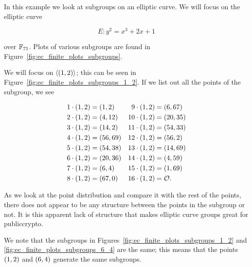 \begin{example}

In this example we look at \glspl{subgroup} on an \gls{elliptic curve}.
We will focus on the \gls{elliptic curve}

\begin{equation}
    E: y^{2} = x^{3} + 2x + 1
\end{equation}

\noindent
over $\mathbb{F}_{71}$.
Plots of various \glspl{subgroup} are found in
Figure~\ref{fig:ec_finite_plots_subgroups}.

We will focus on $\left\langle \left( 1,2 \right) \right\rangle$;
this can be seen in
Figure~\ref{fig:ec_finite_plots_subgroups_1_2}.
If we list out all the points of the \gls{subgroup}, we see

\begin{align}
    1\cdot \left( 1,2 \right)  &= \left( 1,2 \right)
        &
    9\cdot \left( 1,2 \right)  &= \left( 6,67 \right) \nonumber\\
    2\cdot \left( 1,2 \right)  &= \left( 4,12 \right)
        &
    10\cdot \left( 1,2 \right) &= \left( 20,35 \right) \nonumber\\
    3\cdot \left( 1,2 \right)  &= \left( 14,2 \right)
        &
    11\cdot \left( 1,2 \right) &= \left( 54,33 \right) \nonumber\\
    4\cdot \left( 1,2 \right)  &= \left( 56,69 \right)
        &
    12\cdot \left( 1,2 \right) &= \left( 56,2 \right) \nonumber\\
    5\cdot \left( 1,2 \right)  &= \left( 54,38 \right)
        &
    13\cdot \left( 1,2 \right) &= \left( 14,69 \right) \nonumber\\
    6\cdot \left( 1,2 \right)  &= \left( 20,36 \right)
        &
    14\cdot \left( 1,2 \right) &= \left( 4,59 \right) \nonumber\\
    7\cdot \left( 1,2 \right)  &= \left( 6,4 \right)
        &
    15\cdot \left( 1,2 \right) &= \left( 1,69 \right) \nonumber\\
    8\cdot \left( 1,2 \right)  &= \left( 67,0 \right)
        &
    16\cdot \left( 1,2 \right) &= \mathcal{O}.
    \label{eq:elliptic_ecdlp}
\end{align}

\noindent
As we look at the point distribution and compare it with
the rest of the points,
there does not appear to be any structure between
the points in the \gls{subgroup} or not.
It is this apparent lack of structure that makes \gls{elliptic curve}
\glspl{group} great for \gls{publiccrypto}.

We note that the \glspl{subgroup} in
Figures~\ref{fig:ec_finite_plots_subgroups_1_2}
and \ref{fig:ec_finite_plots_subgroups_6_4} are the same;
this means that the points $\left( 1,2 \right)$ and $\left( 6,4 \right)$
generate the same \glspl{subgroup}.
\end{example}

